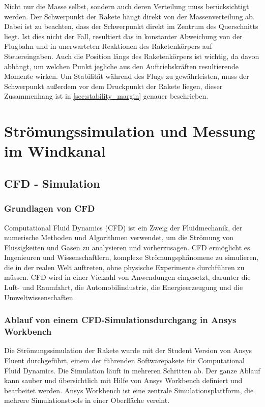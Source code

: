 Nicht nur die Masse selbst, sondern auch deren Verteilung muss berücksichtigt werden. Der Schwerpunkt der Rakete hängt direkt von der Massenverteilung ab. Dabei ist zu beachten, dass der Schwerpunkt direkt im Zentrum des Querschnitts liegt. Ist dies nicht der Fall, resultiert das in konstanter Abweichung von der Flugbahn und in unerwarteten Reaktionen des Raketenkörpers auf Steuereingaben. Auch die Position längs des Raketenkörpers ist wichtig, da davon abhängt, um welchen Punkt jegliche aus den Auftriebskräften resultierende Momente wirken. Um Stabilität während des Flugs zu gewährleisten, muss der Schwerpunkt außerdem vor dem Druckpunkt der Rakete liegen, dieser Zusammenhang ist in \ref{sec:stability_margin} genauer beschrieben.

\chapter{Strömungssimulation und Messung im Windkanal}

\section{CFD - Simulation}
\label{sec:cfd_simulation}

\subsection{Grundlagen von CFD}
\label{subsec:cfd_basics}
Computational Fluid Dynamics (CFD) ist ein Zweig der Fluidmechanik, der numerische Methoden und Algorithmen verwendet, um die Strömung von Flüssigkeiten und Gasen zu analysieren und vorherzusagen. CFD ermöglicht es Ingenieuren und Wissenschaftlern, komplexe Strömungsphänomene zu simulieren, die in der realen Welt auftreten, ohne physische Experimente durchführen zu müssen. CFD wird in einer Vielzahl von Anwendungen eingesetzt, darunter die Luft- und Raumfahrt, die Automobilindustrie, die Energieerzeugung und die Umweltwissenschaften.

\subsection{Ablauf von einem CFD-Simulationsdurchgang in Ansys Workbench}
\label{subsec:ansys_fluent}
Die Strömungssimulation der Rakete wurde mit der Student Version von Ansys Fluent durchgeführt, einem der führenden Softwarepakete für Computational Fluid Dynamics. Die Simulation läuft in mehreren Schritten ab. Der ganze Ablauf kann sauber und übersichtlich mit Hilfe von Ansys Workbench definiert und bearbeitet werden. Ansys Workbench ist eine zentrale Simulationsplattform, die mehrere Simulationstools in einer Oberfläche vereint.

